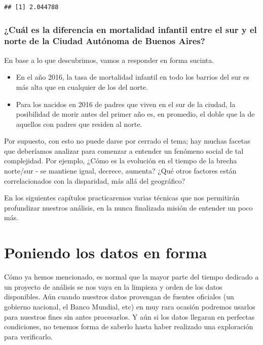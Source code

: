 \documentclass[spanish,]{book}
\begin{document}
\begin{verbatim}
## [1] 2.044788
\end{verbatim}

\hypertarget{cual-es-la-diferencia-en-mortalidad-infantil-entre-el-sur-y-el-norte-de-la-ciudad-autonoma-de-buenos-aires}{%
\subsection{¿Cuál es la diferencia en mortalidad infantil entre el sur y el norte de la Ciudad Autónoma de Buenos Aires?}\label{cual-es-la-diferencia-en-mortalidad-infantil-entre-el-sur-y-el-norte-de-la-ciudad-autonoma-de-buenos-aires}}

En base a lo que descubrimos, vamos a responder en forma sucinta.

\begin{itemize}
\item
  En el año 2016, la tasa de mortalidad infantil en todo los barrios del sur es más alta que en cualquier de los del norte.
\item
  Para los nacidos en 2016 de padres que viven en el sur de la ciudad, la posibilidad de morir antes del primer año es, en promedio, el doble que la de aquellos con padres que residen al norte.
\end{itemize}

Por supuesto, con esto no puede darse por cerrado el tema; hay muchas facetas que deberíamos analizar para comenzar a entender un fenómeno social de tal complejidad. Por ejemplo, ¿Cómo es la evolución en el tiempo de la brecha norte/sur - se mantiene igual, decrece, aumenta? ¿Qué otros factores están correlacionados con la disparidad, más allá del geográfico?

En los siguientes capítulos practicaremos varias técnicas que nos permitirán profundizar nuestros análisis, en la nunca finalizada misión de entender un poco más.

\hypertarget{poniendo-los-datos-en-forma}{%
\chapter{Poniendo los datos en forma}\label{poniendo-los-datos-en-forma}}

Cómo ya hemos mencionado, es normal que la mayor parte del tiempo dedicado a un proyecto de análisis se nos vaya en la limpieza y orden de los datos disponibles. Aún cuando nuestros datos provengan de fuentes oficiales (un gobierno nacional, el Banco Mundial, etc) en muy rara ocasión podremos usarlos para nuestros fines sin antes procesarlos. Y aún si los datos llegaran en perfectas condiciones, no tenemos forma de saberlo hasta haber realizado una exploración para verificarlo.
\end{document}
